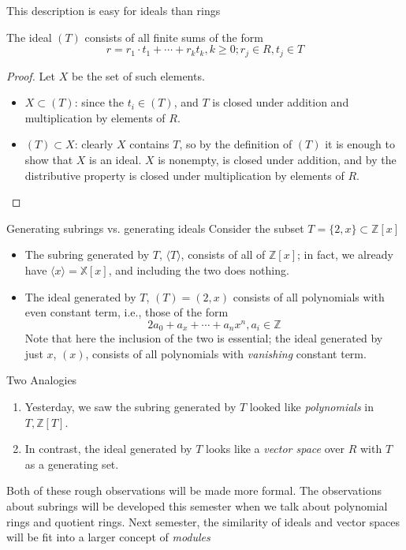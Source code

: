 \documentclass{beamer}
\begin{document}
\begin{frame}{This description is easy for ideals than rings}


\begin{lemma}
The ideal $(T)$ consists of all finite sums of the form
$$r=r_1\cdot t_1+\cdots+r_kt_k, k\geq 0; r_j\in R, t_j\in T$$
\end{lemma}
\begin{proof}
Let $X$ be the set of such elements.  

\begin{itemize}
\item $X\subset (T)$: since the $t_i\in (T)$, and $T$ is closed under addition and multiplication by elements of $R$.
\item $(T)\subset X$: clearly $X$ contains $T$, so by the definition of $(T)$ it is enough to show that $X$ is an ideal.  $X$ is nonempty, is closed under addition, and by the distributive property is closed under multiplication by elements of $R$.
\end{itemize}
\end{proof}

\end{frame}


\begin{frame}{Generating subrings vs. generating ideals}
Consider the subset $T=\{2,x\}\subset\mathbb{Z}[x]$ 
\begin{itemize}
\item The subring generated by $T$, $\langle T\rangle$, consists of all of $\mathbb{Z}[x]$; in fact, we already have $\langle x\rangle=\mathbb{X}[x]$, and including the two does nothing.
\item The ideal generated by $T$, $(T)=(2,x)$ consists of all polynomials with even constant term, i.e., those of the form
$$2a_0+a_x+\cdots+a_nx^n, a_i\in\mathbb{Z}$$
Note that here the inclusion of the two is essential; the ideal generated by just $x$, $(x)$, consists of all polynomials with \emph{vanishing} constant term.

\end{itemize}



\end{frame}




\begin{frame}{Two Analogies}

\begin{enumerate}
\item Yesterday, we saw the subring generated by $T$ looked like \emph{polynomials} in $T, \mathbb{Z}[T]$.

\item In contrast, the ideal generated by $T$ looks like a \emph{vector space} over $R$ with $T$ as a generating set.
\end{enumerate}

Both of these rough observations will be made more formal.   The observations about subrings will be developed this semester when we talk about polynomial rings and quotient rings.  Next semester, the similarity of ideals and vector spaces will be fit into a larger concept of \emph{modules}


\end{frame}
\end{document}

